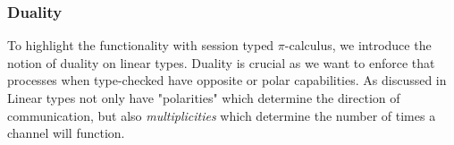 
\subsubsection{Duality}

To highlight the functionality with session typed $\pi$-calculus, we introduce the notion of duality on linear types. Duality is crucial as we want to enforce that processes when type-checked have opposite or polar capabilities. As discussed in \citep{kobayashi1999linearity} Linear types not only have "polarities" which determine the direction of communication, but also \textit{multiplicities} which determine the number of times a channel will function.

